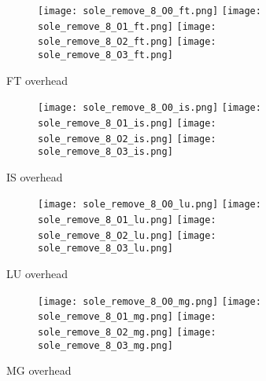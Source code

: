 \documentclass[11pt]{article}
\begin{document}
    \begin{figure}[ht]
        \begin{subfigure}{\linewidth}
            \texttt{[image: sole\_remove\_8\_O0\_ft.png]}
            \texttt{[image: sole\_remove\_8\_O1\_ft.png]}
            \texttt{[image: sole\_remove\_8\_O2\_ft.png]}
            \texttt{[image: sole\_remove\_8\_O3\_ft.png]}
        \end{subfigure}\par\medskip
        \caption{FT overhead}
        \label{fig:sole_figs_4}
    \end{figure}
\begin{figure}[ht]
        \begin{subfigure}{\linewidth}
            \texttt{[image: sole\_remove\_8\_O0\_is.png]}\hfill
            \texttt{[image: sole\_remove\_8\_O1\_is.png]}\hfill
            \texttt{[image: sole\_remove\_8\_O2\_is.png]}\hfill
            \texttt{[image: sole\_remove\_8\_O3\_is.png]}\hfill
        \end{subfigure}\par\medskip
        \caption{IS overhead}
        \label{fig:sole_figs_5}
    \end{figure}

    \begin{figure}[ht]
        \begin{subfigure}{\linewidth}
            \texttt{[image: sole\_remove\_8\_O0\_lu.png]}\hfill
            \texttt{[image: sole\_remove\_8\_O1\_lu.png]}\hfill
            \texttt{[image: sole\_remove\_8\_O2\_lu.png]}\hfill
            \texttt{[image: sole\_remove\_8\_O3\_lu.png]}\hfill
        \end{subfigure}\par\medskip
        \caption{LU overhead}
        \label{fig:sole_figs_6}
    \end{figure}

    \begin{figure}[ht]
        \begin{subfigure}{\linewidth}
            \texttt{[image: sole\_remove\_8\_O0\_mg.png]}\hfill
            \texttt{[image: sole\_remove\_8\_O1\_mg.png]}\hfill
            \texttt{[image: sole\_remove\_8\_O2\_mg.png]}\hfill
            \texttt{[image: sole\_remove\_8\_O3\_mg.png]}\hfill
        \end{subfigure}\par\medskip
        \caption{MG overhead}
        \label{fig:sole_figs_7}
    \end{figure}
\end{document}
